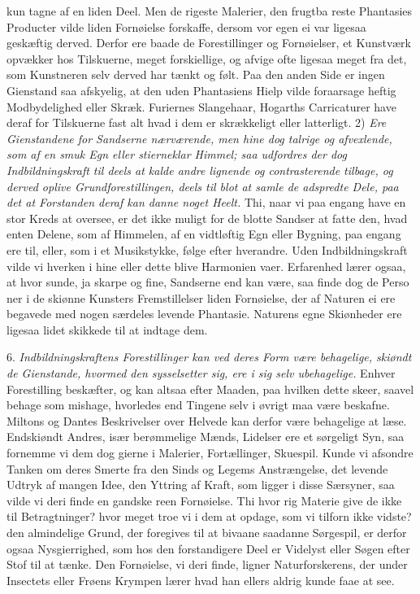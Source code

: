 \documentclass[12pt,a4paper]{article}
\newcommand{\opage}[1]{\marginnote{\footnotesize\textit{[#1]}}}
\begin{document}
kun tagne af en liden Deel. Men de rigeste Malerier, den frugtba%
\opage{238}reste Phantasies Producter vilde liden Fornøielse forskaffe, dersom vor egen ei var
ligesaa geskæftig derved. Derfor ere baade de Forestillinger og Fornøielser, et Kunstværk
opvækker hos Tilskuerne, meget forskiellige, og afvige ofte ligesaa meget fra det, som
Kunstneren selv derved har tænkt og følt. Paa den anden Side er ingen Gienstand saa
afskyelig, at den uden Phantasiens Hielp vilde foraarsage heftig Modbydelighed eller Skræk.
Furiernes Slangehaar, Hogarths Carricaturer have deraf for Tilskuerne fast alt hvad i dem
er skrækkeligt eller latterligt. 2) \emph{Ere Gienstandene for Sandserne nærværende, men
hine dog talrige og afvexlende, som af en smuk Egn eller stierneklar Himmel; saa udfordres
der dog Indbildningskraft til deels at kalde andre lignende og contrasterende tilbage, og
derved oplive Grundforestillingen, deels til blot at samle de adspredte Dele, paa det at
Forstanden deraf kan danne noget Heelt.} Thi, naar vi paa engang have en stor Kreds at
oversee, er det ikke muligt for de blotte Sandser at fatte den, hvad enten Delene, som af
Himmelen, af en vidtløftig Egn eller Bygning, paa engang ere til, eller, som i et
Musikstykke, følge efter hverandre. Uden Indbildningskraft vilde vi hverken i hine eller
dette blive Harmonien vaer. Erfarenhed lærer ogsaa, at hvor sunde, ja skarpe og fine,
Sandserne end kan være, saa finde dog de Perso%
\opage{239}ner i de skiønne Kunsters Fremstillelser liden Fornøielse, der af Naturen ei ere begavede
med nogen særdeles levende Phantasie. Naturens egne Skiønheder ere ligesaa lidet skikkede
til at indtage dem.

6. \emph{Indbildningskraftens Forestillinger kan ved deres Form være behagelige, skiøndt de
Gienstande, hvormed den sysselsetter sig, ere i sig selv ubehagelige.} Enhver Forestilling
beskæfter, og kan altsaa efter Maaden, paa hvilken dette skeer, saavel behage som mishage,
hvorledes end Tingene selv i øvrigt maa være beskafne. Miltons og Dantes Beskrivelser over
Helvede kan derfor være behagelige at læse. Endskiøndt Andres, især berømmelige Mænds,
Lidelser ere et sørgeligt Syn, saa fornemme vi dem dog gierne i Malerier, Fortællinger,
Skuespil. Kunde vi afsondre Tanken om deres Smerte fra den Sinds og Legems Anstrængelse,
det levende Udtryk af mangen Idee, den Yttring af Kraft, som ligger i disse Særsyner, saa
vilde vi deri finde en gandske reen Fornøielse. Thi hvor rig Materie give de ikke til
Betragtninger? hvor meget troe vi i dem at opdage, som vi tilforn ikke vidste? den
almindelige Grund, der foregives til at bivaane saadanne Sørgespil, er derfor ogsaa
Nysgierrighed, som hos den forstandigere Deel er Videlyst eller Søgen efter Stof til at
tænke. Den Fornøielse, vi deri finde, ligner Naturforskerens, der
\opage{240} under Insectets eller Frøens Krympen lærer hvad han ellers aldrig kunde faae at see.
\end{document}
